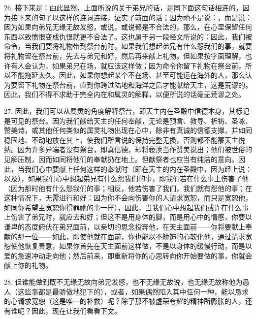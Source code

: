 26. 接下来是：由此显然，上面所说的关于弟兄的话，是同下面这句话相连的，因为接下来的句子以这样的连词连接，证实了前面的话；因为祂不是说：，而是说：因为如果向弟兄无缘无故发怒，或说，或说都是不合法的，那么，在心里保留任何东西以致愤恨变成仇恨就更不合法了。这也属于另一段经文所说的：因此，我们被命令，当我们要将礼物带到祭台前时，如果我们想起弟兄有什么怨我们的事，就要将礼物留在祭台前，先去与弟兄和好，然后再来献上礼物。但如果按字面理解，也许有人会认为，如果弟兄在场，就应该这样做；因为命令你留下礼物在祭台前，所以不能拖延太久。因此，如果你想起某个不在场、甚至可能远在海外的人，那么认为要留下礼物在祭台前，直到你跨过陆地和海洋之后才能献给天主，这是荒谬的。因此，我们不得不求助于完全内在和属灵的解释，以便所说的话毫无荒谬之处。\par

27. 因此，我们可以从属灵的角度解释祭台，即天主内在圣殿中信德本身，其标记是可见的祭台。因为我们献给天主的任何奉献，无论是预言、教导、祈祷、圣咏、赞美诗，或其他任何类似的属灵礼物出现在心中，除非有真诚的信德支撑，并如同稳固地、不动地放在其上，使我们所言说的保持完整无损，否则都不能蒙天主悦纳。因为许多异端者没有祭台，即真信德，却将亵渎当作赞美说出；他们被世俗的见解压制，因而如同将他们的奉献扔在地上。但献祭者也应当有纯洁的意向。因此，当我们心中要献上任何这样的奉献时（即在天主的内在圣殿中，因为经上说：以及），如果我们心中想起弟兄有什么怨我们的事，即我们若在什么事上伤害了他（因为那时他有什么怨我们的事；相反，他若伤害了我们，我们就有怨他的事；在这种情况下，无需进行和好：因为你不会向伤害你的人请求宽恕，而只是宽恕他，如同你希望主宽恕你得罪祂的事一样），因此，当我们心中想起我们或许在什么事上伤害了弟兄时，就应去和好；但这不是用身体的脚，而是用心中的情感，你要以谦卑的态度俯伏在弟兄面前，以亲切的思念投奔他，在天主面前——你将要献上奉献的那一位——如此，即使他就在面前，你也能以不矫饰的心软化他，通过请求宽恕使他恢复善意，如果你首先在天主面前这样做，不是以身体的缓慢行动，而是以爱的急速冲动走向他；然后前来，即重新将你的心思转向你开始要做的事，你就会献上你的礼物。\par

28. 但谁能做到既不无缘无故向弟兄发怒，也不无缘无故说，也无缘无故称他为愚人（这些事都是最骄傲地犯下的），或者，如果偶然陷入其中任何一种，能以恳求的心请求宽恕（这是唯一的补救）呢？除了那不被虚荣夸耀的精神所膨胀的人，还有谁呢？因此，现在让我们看看下文。\par


